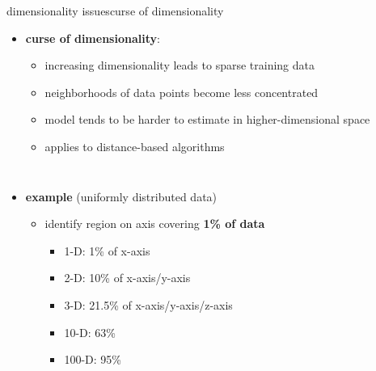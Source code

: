 		\begin{frame}{dimensionality issues}{curse of dimensionality}
            \begin{itemize}
                \item \textbf{curse of dimensionality}: 
                    \begin{itemize}
                        \item   increasing dimensionality leads to sparse training data
                        \item   neighborhoods of data points become less concentrated
                        \item   model tends to be harder to estimate in higher-dimensional space
                        \item   applies to distance-based algorithms
                    \end{itemize}
            \end{itemize}
            \begin{columns}
            \begin{itemize}
                \item   \textbf{example} (uniformly distributed data)
                    \begin{itemize}
                        \item   identify region on axis covering \textbf{1\% of data}
                            \begin{itemize}
                                \item   1-D: 1\% of x-axis
                                \item   2-D: 10\% of x-axis/y-axis
                                \item   3-D: 21.5\% of x-axis/y-axis/z-axis
                                \item   10-D: 63\%
                                \item   100-D: 95\%
                            \end{itemize}
                    \end{itemize}
            \end{itemize}
            \vspace{-8mm}
            \begin{center}
            \end{center}

\end{columns}
\end{frame}
